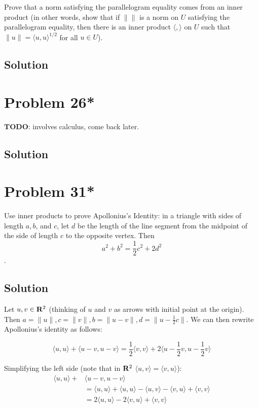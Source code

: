 \documentclass{article}
\begin{document}
\vs

Prove that a norm satisfying the parallelogram equality comes from an inner product (in other words, show that if $\|\|$ is a norm on $U$ satisfying the parallelogram equality, then there is an inner product $\langle,\rangle$ on $U$ such that $\|u\|=\langle u,u\rangle^{1/2}$ for all $u\in U$).

\subsection*{Solution}

\section*{Problem 26*}
$\textbf{TODO}$: involves calculus, come back later.

\subsection*{Solution}

\section*{Problem 31*}
Use inner products to prove Apollonius's Identity: in a triangle with sides of length $a,b$, and $c$, let $d$ be the length of the line segment from the midpoint of the side of length $c$ to the opposite vertex. Then
\[a^2+b^2=\frac{1}{2}c^2+2d^2\].

\subsection*{Solution}
Let $u,v\in\mathbf{R}^2$ (thinking of $u$ and $v$ as arrows with initial point at the origin). Then $a=\|u\|, c=\|v\|, b=\|u-v\|, d=\|u-\frac{1}{2}c\|$. We can then rewrite Apollonius's identity as follows:

\[\langle u,u\rangle+\langle u-v,u-v\rangle=\frac{1}{2}\langle v,v\rangle+2\langle u-\frac{1}{2}v,u-\frac{1}{2}v\rangle\]

Simplifying the left side (note that in $\mathbf{R}^2$ $\langle u,v\rangle=\langle v,u\rangle$):
\begin{align*}
\langle u,u\rangle+&\langle u-v,u-v\rangle\\
&=\langle u,u\rangle+\langle u,u\rangle-\langle u,v\rangle-\langle v,u\rangle+\langle v,v\rangle\\
&=2\langle u,u\rangle-2\langle v,u\rangle+\langle v,v\rangle
\end{align*}
\end{document}
